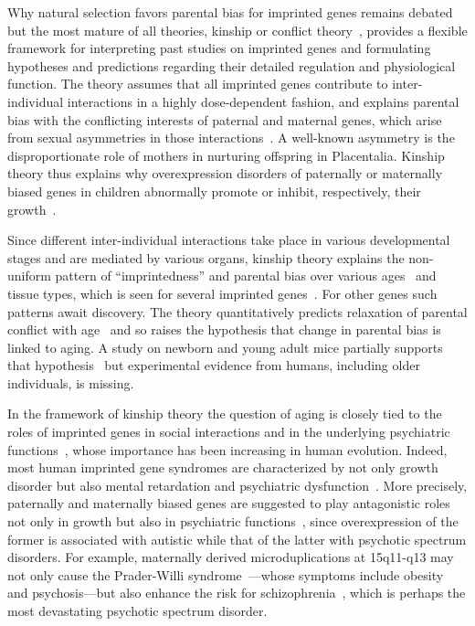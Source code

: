 \documentclass[letterpaper]{article}
\begin{document}
Why natural selection favors parental bias for imprinted genes remains
debated~\cite{Wilkins2003,McDonald2005,Keverne2015} but the most mature of all
theories, kinship or conflict theory~\cite{Wilkins2003}, provides a flexible
framework for interpreting past studies on imprinted genes and formulating
hypotheses and predictions regarding their detailed regulation and
physiological function.  The theory assumes that all imprinted genes contribute to
inter-individual interactions in a highly dose-dependent fashion, and explains
parental bias with the conflicting interests of paternal and maternal genes,
which arise from sexual asymmetries in those interactions~\cite{Wilkins2003}.
A well-known asymmetry is the disproportionate role of mothers in
nurturing offspring in Placentalia.  Kinship theory thus explains why
overexpression disorders of paternally or maternally biased genes in children
abnormally promote or inhibit, respectively, their
growth~\cite{Plasschaert2014,Peters2014}.

Since different inter-individual interactions take place in various
developmental stages and are mediated by various organs, kinship theory
explains the non-uniform pattern of ``imprintedness'' and parental bias over
various ages~\cite{Bourke2007} and tissue types, which is seen for several
imprinted genes~\cite{Plasschaert2014,Peters2014}.  For other genes such
patterns await discovery.  The theory quantitatively predicts relaxation of
parental conflict with age~\cite{Ubeda2012} and so raises the hypothesis that
change in parental bias is linked to aging.  A study on newborn and young adult mice
partially supports that hypothesis~\cite{Perez2015} but experimental evidence
from humans, including older individuals, is missing.

In the framework of kinship theory the question of aging is closely tied to
the roles of imprinted genes in social interactions and in the underlying
psychiatric functions~\cite{Ubeda2012,Wilkins2003}, whose importance has been
increasing in human evolution.  Indeed, most human imprinted gene syndromes
are characterized by not only growth disorder but also mental retardation and
psychiatric dysfunction~\cite{Plasschaert2014,Peters2014}.  More precisely,
paternally and maternally biased genes are suggested to play antagonistic
roles not only in growth but also in psychiatric functions~\cite{Crespi2008a},
since overexpression of the former is associated with autistic while that of
the latter with psychotic spectrum disorders.  For example, maternally derived
microduplications at 15q11-q13 may not only cause the Prader-Willi
syndrome~\cite{Peters2014}---whose symptoms include obesity and
psychosis---but also enhance the risk for
schizophrenia~\cite{Ingason2011,Sullivan2012}, which is perhaps the most
devastating psychotic spectrum disorder.
\end{document}
